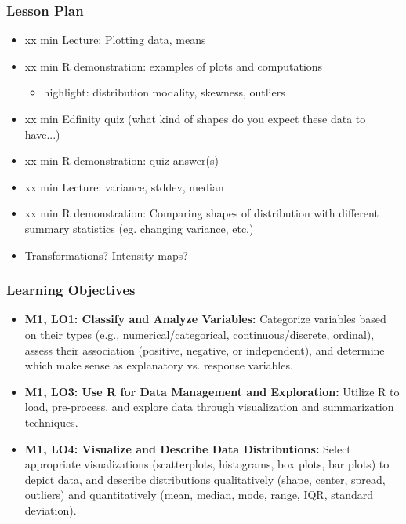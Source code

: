 \begin{frame}
    \frametitle{Lesson Plan}
    \begin{itemize}
        \item xx min Lecture: Plotting data, means
        \item xx min R demonstration: examples of plots and computations
        \begin{itemize}
            \item  highlight: distribution modality, skewness, outliers
        \end{itemize}
        \item xx min Edfinity quiz (what kind of shapes do you expect these data to have...)
        \item xx min R demonstration: quiz answer(s)
        \item xx min Lecture: variance, stddev, median
        \item xx min R demonstration: Comparing shapes of distribution with different summary statistics (eg. changing variance, etc.)
        \item Transformations? Intensity maps?
    \end{itemize}
\end{frame}

\begin{frame}
    \frametitle{Learning Objectives}
    \begin{itemize}
        \item \textbf{M1, LO1: Classify and Analyze Variables:} Categorize variables based on their types (e.g., numerical/categorical, continuous/discrete, ordinal), assess their association (positive, negative, or independent), and determine which make sense as explanatory vs. response variables.
        \item \textbf{M1, LO3: Use R for Data Management and Exploration:} Utilize R to load, pre-process, and explore data through visualization and summarization techniques.
        \item \textbf{M1, LO4: Visualize and Describe Data Distributions:} Select appropriate visualizations (scatterplots, histograms, box plots, bar plots) to depict data, and describe distributions qualitatively (shape, center, spread, outliers) and quantitatively (mean, median, mode, range, IQR, standard deviation).
    \end{itemize}
\end{frame}

